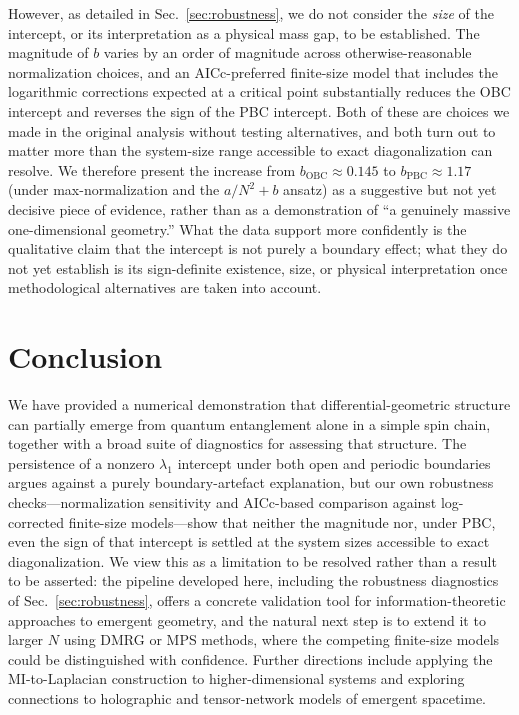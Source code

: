 \documentclass[aps,prd,twocolumn,superscriptaddress,nofootinbib]{revtex4-2}
\begin{document}
However, as detailed in Sec.~\ref{sec:robustness}, we do not consider the
\emph{size} of the intercept, or its interpretation as a physical mass gap, to
be established. The magnitude of $b$ varies by an order of magnitude across
otherwise-reasonable normalization choices, and an AICc-preferred finite-size
model that includes the logarithmic corrections expected at a critical point
substantially reduces the OBC intercept and reverses the sign of the PBC
intercept. Both of these are choices we made in the original analysis without
testing alternatives, and both turn out to matter more than the
system-size range accessible to exact diagonalization can resolve. We
therefore present the increase from $b_{\mathrm{OBC}}\approx 0.145$ to
$b_{\mathrm{PBC}}\approx 1.17$ (under max-normalization and the $a/N^2+b$
ansatz) as a suggestive but not yet decisive piece of evidence, rather than
as a demonstration of ``a genuinely massive one-dimensional geometry.'' What
the data support more confidently is the qualitative claim that the
intercept is not purely a boundary effect; what they do not yet establish is
its sign-definite existence, size, or physical interpretation once
methodological alternatives are taken into account.

\section{Conclusion}

We have provided a numerical demonstration that differential-geometric
structure can partially emerge from quantum entanglement alone in a simple
spin chain, together with a broad suite of diagnostics for assessing that
structure. The persistence of a nonzero $\lambda_1$ intercept under both open
and periodic boundaries argues against a purely boundary-artefact
explanation, but our own robustness checks---normalization sensitivity and
AICc-based comparison against log-corrected finite-size models---show that
neither the magnitude nor, under PBC, even the sign of that intercept is
settled at the system sizes accessible to exact diagonalization. We view this
as a limitation to be resolved rather than a result to be asserted: the
pipeline developed here, including the robustness diagnostics of
Sec.~\ref{sec:robustness}, offers a concrete validation tool for
information-theoretic approaches to emergent geometry, and the natural next
step is to extend it to larger $N$ using DMRG or MPS methods, where the
competing finite-size models could be distinguished with confidence. Further
directions include applying the MI-to-Laplacian construction to
higher-dimensional systems and exploring connections to holographic and
tensor-network models of emergent spacetime.
\end{document}
